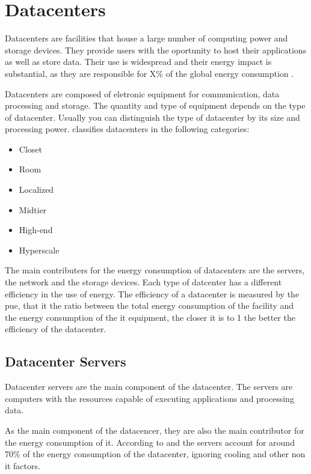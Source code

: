 \section{Datacenters}

Datacenters are facilities that house a large number of computing power and storage devices. They provide users with the oportunity to host their applications as well as store data. Their use is widespread and their energy impact is substantial, as they are responsible for X\% of the global energy consumption \cite{get source}.

Datacenters are composed of eletronic equipment for communication, data processing and storage. The quantity and type of equipment depends on the type of datacenter. Usually you can distinguish the type of datacenter by its size and processing power. \citet{US-report2016} classifies datacenters in the following categories:

\begin{itemize}
    \item Closet
    \item Room
    \item Localized
    \item Midtier
    \item High-end
    \item Hyperscale
\end{itemize}

The main contributers for the energy consumption of datacenters are the servers, the network and the storage devices. Each type of datcenter has a different efficiency in the use of energy. The efficiency of a datacenter is measured by the \ac{pue}, that it the ratio between the total energy consumption of the facility and the energy consumption of the \ac{it} equipment, the closer it is to 1 the better the efficiency of the datacenter.

\subsection{Datacenter Servers}

Datacenter servers are the main component of the datacenter. The servers are computers with the resources capable of executing applications and processing data.

As the main component of the datacencer, they are also the main contributor for the energy consumption of it. According to \citet{Cheung} and \citet{Miyuru} the servers account for around 70\% of the energy consumption of the datacenter, ignoring cooling and other non \ac{it} factors.


